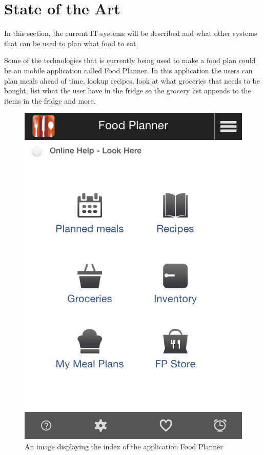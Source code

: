 \section{State of the Art}
In this section, the current IT-systems will be described and what other systems that can be used to plan what food to eat.

Some of the technologies that is currently being used to make a food plan could be an mobile application called Food Planner.
In this application the users can plan meals ahead of time, lookup recipes, look at what groceries that needs to be bought,
list what the user have in the fridge so the grocery list appends to the items in the fridge and more.

\begin{figure}[H]
    \centering
    \includegraphics[width=\textwidth]{Grafik/FoodPlanner/index}
    \caption{An image displaying the index of the application Food Planner}
    \label{FoodPlannerIndex}
\end{figure}




